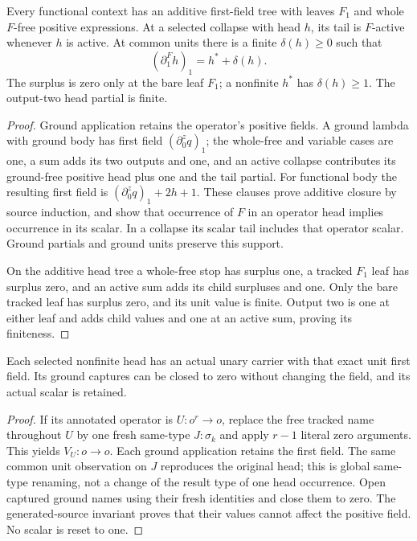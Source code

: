 \begin{lemma}\label{lem:affine-head}
Every functional context has an additive first-field tree with leaves $F_1$
and whole $F$-free positive expressions.  At a selected collapse with head
$h$, its tail is $F$-active whenever $h$ is active.  At common units there is
a finite $\delta(h)\ge0$ such that
\[
 (\partial^F_1h)_1=h^*+\delta(h).
\]
The surplus is zero only at the bare leaf $F_1$; a nonfinite $h^*$ has
$\delta(h)\ge1$.  The output-two head partial is finite.
\end{lemma}
\begin{proof}
Ground application retains the operator's positive fields.  A ground lambda
with ground body has first field $(\partial^z_0q)_1$; the whole-free and
variable cases are one, a sum adds its two outputs and one, and an active
collapse contributes its ground-free positive head plus one and the tail
partial.  For functional body the resulting first field is
$(\partial^z_0q)_1+2h+1$.  These clauses prove additive closure by source
induction, and show that occurrence of $F$ in an operator head implies
occurrence in its scalar.  In a collapse its scalar tail includes that
operator scalar.  Ground partials and ground units preserve this support.

On the additive head tree a whole-free stop has surplus one, a tracked
$F_1$ leaf has surplus zero, and an active sum adds its child surpluses
and one.  Only the bare tracked leaf has surplus zero, and its unit value
is finite.  Output two is one at either leaf and adds child values and one
at an active sum, proving its finiteness.
\end{proof}

\begin{lemma}\label{lem:carriers}
Each selected nonfinite head has an actual unary carrier with that exact
unit first field.  Its ground captures can be closed to zero without changing
the field, and its actual scalar is retained.
\end{lemma}
\begin{proof}
If its annotated operator is $U:o^r\to o$, replace the free tracked name
throughout $U$ by one fresh same-type $J:\sigma_k$ and apply $r-1$ literal
zero arguments.  This yields $V_U:o\to o$.  Each ground application retains
the first field.  The same common unit observation on $J$ reproduces the
original head; this is global same-type renaming, not a change of the result
type of one head occurrence.  Open captured ground names using their fresh
identities and close them to zero.  The generated-source invariant proves
that their values cannot affect the positive field.  No scalar is reset to one.
\end{proof}

